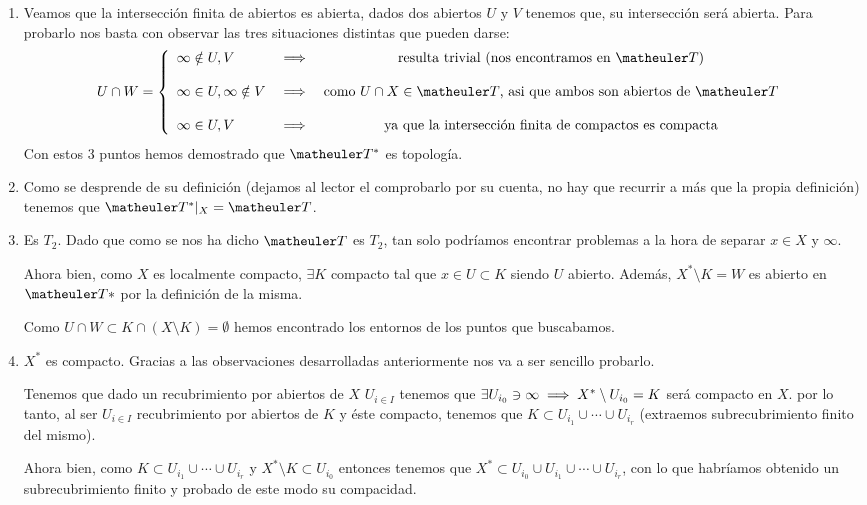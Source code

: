 \begin{obs}
\begin{enumerate}
	\item Veamos que la intersección finita de abiertos es abierta, dados dos abiertos $U$ y $V$ tenemos que, su intersección será abierta. Para probarlo nos basta con observar las tres situaciones distintas que pueden darse:
	\begin{equation}
	U\cap W=
	\left\{ \begin{array}{lcc}
	\infty\notin U,V &  \ra  & \textup{resulta trivial (nos encontramos en }\T)\\
	\\\infty\in U,\infty\notin V &   \ra  & \textup{como $U\cap X\in\T$, asi que ambos son abiertos de $\T$}\\
	\\\infty\in U,V &  \ra  & \textup{ya que la intersección finita de compactos es compacta}\\
	\end{array}
	\right.
	\end{equation}
	Con estos 3 puntos hemos demostrado que $\T^*$ es topología.
	\item Como se desprende de su definición (dejamos al lector el comprobarlo por su cuenta, no hay que recurrir a más que la propia definición) tenemos que $\T^*|_X=\T$. 
	\item Es $T_2$. Dado que como se nos ha dicho $\T$ es $T_2$, tan solo podríamos encontrar problemas a la hora de separar $x\in X$ y $\infty$.
	
	Ahora bien, como $X$ es localmente compacto, $\exists K$ compacto tal que $x\in U\subset K$ siendo $U$ abierto. Además, $X^*\setminus K=W$ es abierto en $\T*$ por la definición de la misma.
	
	Como $U\cap W\subset K\cap (X\setminus K)=\emptyset$ hemos encontrado los entornos de los puntos que buscabamos. 
	
	
	\item $X^*$ es compacto. Gracias a las observaciones desarrolladas anteriormente nos va a ser sencillo probarlo.
	
	Tenemos que dado un recubrimiento por abiertos de $X$ $U_{i\in I}$ tenemos que $\exists U_{i_0}\ni\infty \implies X^*\setminus U_{i_0}=K$ será compacto en $X$. por lo tanto, al ser $U_{i\in I}$ recubrimiento por abiertos de $K$ y éste compacto, tenemos que $K\subset U_{i_1}\cup\cdots\cup U_{i_r}$ (extraemos subrecubrimiento finito del mismo).
	
	Ahora bien, como $K\subset U_{i_1}\cup\cdots\cup U_{i_r}$ y $X^*\setminus K\subset U_{i_0}$ entonces tenemos que $X^*\subset U_{i_0}\cup  U_{i_1}\cup\cdots\cup U_{i_r}$, con lo que habríamos obtenido un subrecubrimiento finito y probado de este modo su compacidad.
	

\end{enumerate}
\end{obs}

